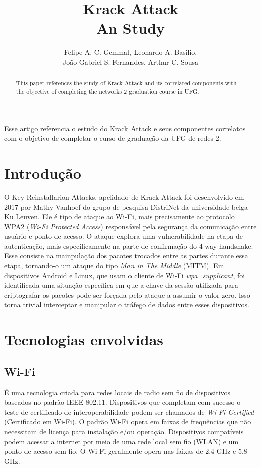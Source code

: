 \documentclass[12pt]{article}
\title{Krack Attack \\ An Study}
\author{Felipe A. C. Gemmal\inst{1}, Leonardo A. Basilio\inst{1},\\ João Gabriel S. Fernandes\inst{1}, Arthur C. Sousa\inst{1} }
\begin{document}
 

\maketitle

\begin{abstract}
	This paper references the study of Krack Attack and its correlated components with the objective of completing the networks 2 graduation course in UFG.
\end{abstract}

\begin{resumo} 
	Esse artigo referencia o estudo do Krack Attack e seus componentes correlatos com o objetivo de completar o curso de graduação da UFG de redes 2.
\end{resumo}


\section{Introdução}
	O Key Reinstallarion Attacks, apelidado de Krack Attack \cite{1} foi desenvolvido em 2017 por Mathy Vanhoef do grupo de pesquisa DistriNet da universidade belga Ku Leuven. Ele é tipo de ataque ao Wi-Fi, mais precisamente ao protocolo WPA2 (\textit{Wi-Fi Protected Access}) responsável pela segurança da comunicação entre usuário e ponto de acesso. O ataque explora uma vulnerabilidade na etapa de autenticação, mais especificamente na parte de  confirmação do 4-way handshake. Esse consiste na mainpulação dos pacotes trocados entre as partes durante essa etapa, tornando-o um ataque do tipo \textit{Man in The Middle} (MITM).
	Em dispositivos Android e Linux, que usam o cliente de Wi-Fi \textit{wpa\_supplicant}, foi identificada uma situação específica em que a chave da sessão utilizada para criptografar os pacotes pode ser forçada pelo ataque a assumir o valor zero. Isso torna trivial interceptar e manipular o tráfego de dados entre esses dispositivos.

\section{Tecnologias envolvidas}
\subsection{Wi-Fi}
É uma tecnologia criada para redes locais de radio sem fio de dispositivos baseados no padrão IEEE 802.11. Dispositivos que completam com sucesso o teste de certificado de interoperabilidade podem ser chamados de \textit{Wi-Fi Certified} (Certificado em Wi-Fi). O padrão Wi-Fi opera em faixas de frequências que não necessitam de licença para instalação e/ou operação. Dispositivos compatíveis podem acessar a internet por meio de uma rede local sem fio (WLAN) e um ponto de acesso sem fio. O Wi-Fi geralmente opera nas faixas de 2,4 GHz e 5,8 GHz.
\end{document}
